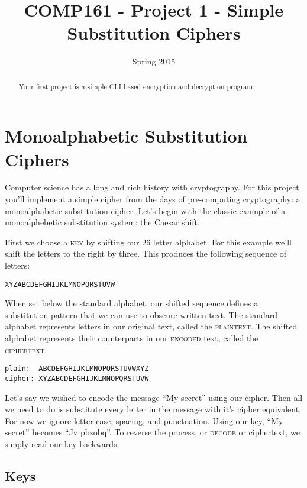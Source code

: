 \documentclass[]{tufte-handout}
\title{COMP161 - Project 1 - Simple Substitution Ciphers}
\author{}
\date{Spring 2015}
\begin{document}
\maketitle

\begin{abstract}
Your first project is a simple CLI-based encryption and decryption program.
\end{abstract}

\section{Monoalphabetic Substitution Ciphers}

Computer science has a long and rich history with cryptography.  For this project you'll implement a simple cipher from the days of pre-computing cryptography: a monoalphabetic substitution cipher.  Let's begin with the classic example of a monoalphebetic substitution system: the Caesar shift. 

First we choose a \textsc{key} by shifting our 26 letter alphabet.  For this example we'll shift the letters to the right by three. This produces the following sequence of letters:
\begin{verbatim}
XYZABCDEFGHIJKLMNOPQRSTUVW
\end{verbatim}
When set below the standard alphabet, our shifted sequence defines a substitution pattern that we can use to obscure written text.  The standard alphabet represents letters in our original text, called the \textsc{plaintext}. The shifted alphabet represents their counterparts in our \textsc{encoded} text, called the \textsc{ciphertext}. 
\begin{verbatim}
plain:  ABCDEFGHIJKLMNOPQRSTUVWXYZ
cipher: XYZABCDEFGHIJKLMNOPQRSTUVW
\end{verbatim}

Let's say we wished to encode the message ``My secret'' using our cipher.  Then all we need to do is substitute every letter in the message with it's cipher equivalent. For now we ignore letter case, spacing, and punctuation.  Using our key, ``My secret'' becomes ``Jv pbzobq''. To reverse the process, or \textsc{decode} or ciphertext, we simply read our key backwards. 

\subsection*{Keys}
\end{document}
